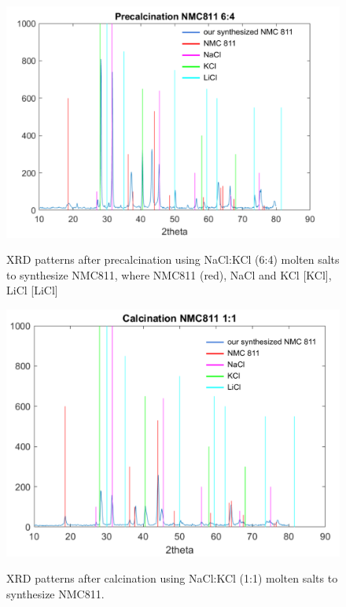 \documentclass{article}
\begin{document}
\begin{figure}[H]
  \centering
  \begin{minipage}{0.7\textwidth}
    \centering
    \includegraphics[width=\textwidth]{XRD3.png}
  \caption{XRD patterns after precalcination using NaCl:KCl (6:4) molten salts to synthesize NMC811,  where NMC811 \cite{mambo} (red), NaCl and KCl [KCl], LiCl [LiCl]}
    \label{XRD3}
  \end{minipage}
  \vfill
  \begin{minipage}{0.7\textwidth}
    \centering
    \includegraphics[width=\textwidth]{XRD4.png}
    \label{fig:XRD_calc}
  \end{minipage}
  \caption{XRD patterns after calcination using NaCl:KCl (1:1) molten salts to synthesize NMC811.}
  \label{XRD4}
\end{figure}
\end{document}
